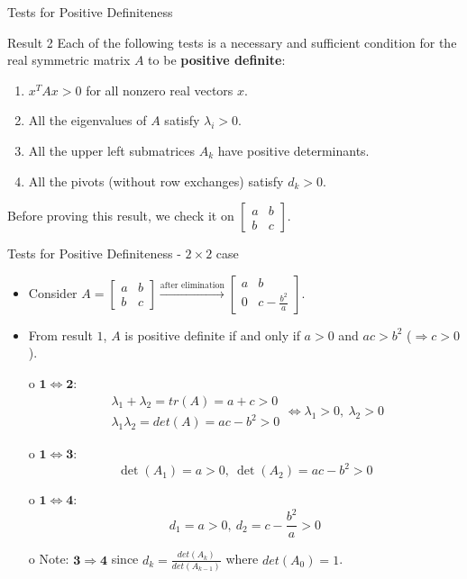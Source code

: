 \documentclass{beamer}
\begin{document}
\begin{frame}{Tests for Positive Definiteness}{}
\begin{block}{Result 2}
Each of the following tests is a necessary and sufficient condition for the real symmetric matrix $A$ to be \textbf{positive definite}:
\begin{enumerate}
    \item $x^TAx > 0$ for all nonzero real vectors $x$.
    \item All the eigenvalues of $A$ satisfy $\lambda_i > 0$.
    \item All the upper left submatrices $A_k$ have positive determinants.
    \item All the pivots (without row exchanges) satisfy $d_k > 0$.
\end{enumerate}
\end{block}
Before proving this result, we check it on $\begin{bmatrix}a&b\\b&c\end{bmatrix}$.
\end{frame}

\begin{frame}{Tests for Positive Definiteness - $2\times 2$ case}{}
\begin{itemize}
    \item Consider $A = \begin{bmatrix}a&b\\b&c\end{bmatrix}\xrightarrow{\text{after elimination}} \begin{bmatrix}a&b\\0&c-\frac{b^2}{a}\end{bmatrix}$.
    \item From result $1$, $A$ is positive definite if and only if $a > 0$ and $ac>b^2$ ($\Rightarrow c > 0$).
    \item[o] $\mathbf{1 \iff  2}$:
        \begin{equation*}
            \begin{matrix}\lambda_1 + \lambda_2 = tr(A) = a+c > 0 \\ \lambda_1\lambda_2 = det(A) = ac-b^2 > 0 \end{matrix} \iff \lambda_1 > 0,\ \lambda_2 > 0
        \end{equation*}
    \item[o] $\mathbf{1 \iff  3}$:
        \begin{equation*}
            \det(A_1) = a > 0,\ \det(A_2) = ac-b^2 > 0
        \end{equation*}
    \item[o] $\mathbf{1 \iff  4}$:
        \begin{equation*}
            d_1 = a > 0,\ d_2 = c-\frac{b^2}{a} > 0
        \end{equation*}
    \item[o] Note: $\mathbf{3 \Rightarrow  4}$ since $d_k = \frac{det(A_k)}{det(A_{k-1})}$ where $det(A_0) = 1$.
    
\end{itemize}
\end{frame}
\end{document}
